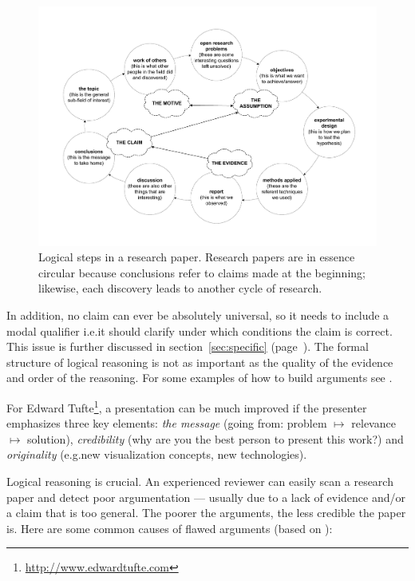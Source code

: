\documentclass[graybox,envcountchap,sectrefs,UStrade]{svmono}
\begin{document}
\begin{figure}[!hbt]
 \begin{center}
  \includegraphics[width=\textwidth]{Fig_macrostructure_basic_flowchart.pdf}
 \caption{Logical steps in a research paper. Research papers are in essence circular because conclusions refer to claims made at the beginning; likewise, each discovery leads to another cycle of research.} \label{Fig:macrostructure_basic_flowchart}
 \end{center}
\end{figure}


In addition, no claim can ever be absolutely universal, so it needs to include a modal qualifier i.e.\@ it should clarify under which conditions the claim is correct. This issue is further discussed in section~\ref{sec:specific} (page~\pageref{sec:specific}). The formal structure of logical reasoning is not as important as the quality of the evidence and order of the reasoning. For some examples of how to build arguments see \citet{Rossiter2010RCS}.\par

For Edward Tufte\footnote{\url{http://www.edwardtufte.com}}, a presentation can be much improved if the presenter emphasizes three key elements: \emph{the message} (going from: problem $\mapsto$ relevance $\mapsto$ solution), \emph{credibility} (why are you the best person to present this work?) and \emph{originality} (e.g.\@ new visualization concepts, new technologies).\par

Logical reasoning is crucial. An experienced reviewer can easily scan a research paper and detect poor argumentation --- usually due to a lack of evidence and/or a claim that is too general. The poorer the arguments, the less credible the paper is. Here are some common causes of flawed arguments (based on \citet{AscheronKickuth2004}):
\end{document}
